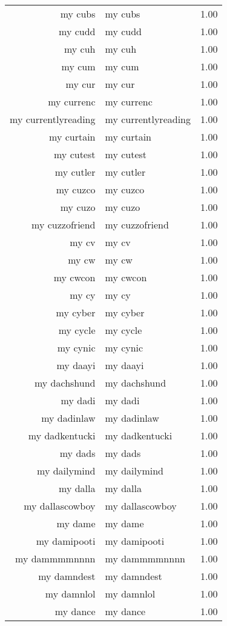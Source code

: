 \begin{table}[ht]
\begin{tabular}{rlr}
  my cubs & my cubs & 1.00 \\ 
  my cudd & my cudd & 1.00 \\ 
  my cuh & my cuh & 1.00 \\ 
  my cum & my cum & 1.00 \\ 
  my cur & my cur & 1.00 \\ 
  my currenc & my currenc & 1.00 \\ 
  my currentlyreading & my currentlyreading & 1.00 \\ 
  my curtain & my curtain & 1.00 \\ 
  my cutest & my cutest & 1.00 \\ 
  my cutler & my cutler & 1.00 \\ 
  my cuzco & my cuzco & 1.00 \\ 
  my cuzo & my cuzo & 1.00 \\ 
  my cuzzofriend & my cuzzofriend & 1.00 \\ 
  my cv & my cv & 1.00 \\ 
  my cw & my cw & 1.00 \\ 
  my cwcon & my cwcon & 1.00 \\ 
  my cy & my cy & 1.00 \\ 
  my cyber & my cyber & 1.00 \\ 
  my cycle & my cycle & 1.00 \\ 
  my cynic & my cynic & 1.00 \\ 
  my daayi & my daayi & 1.00 \\ 
  my dachshund & my dachshund & 1.00 \\ 
  my dadi & my dadi & 1.00 \\ 
  my dadinlaw & my dadinlaw & 1.00 \\ 
  my dadkentucki & my dadkentucki & 1.00 \\ 
  my dads & my dads & 1.00 \\ 
  my dailymind & my dailymind & 1.00 \\ 
  my dalla & my dalla & 1.00 \\ 
  my dallascowboy & my dallascowboy & 1.00 \\ 
  my dame & my dame & 1.00 \\ 
  my damipooti & my damipooti & 1.00 \\ 
  my dammmmnnnn & my dammmmnnnn & 1.00 \\ 
  my damndest & my damndest & 1.00 \\ 
  my damnlol & my damnlol & 1.00 \\ 
  my dance & my dance & 1.00 \\ 

\end{tabular}
\end{table}
